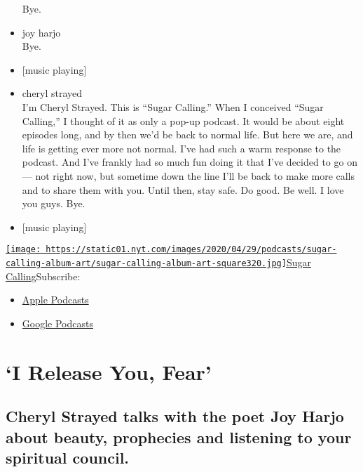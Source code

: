 \begin{itemize}
  Bye.
\item
  joy harjo\\
  Bye.
\item
  {[}music playing{]}
\item
  cheryl strayed\\
  I'm Cheryl Strayed. This is ``Sugar Calling.'' When I conceived
  ``Sugar Calling,'' I thought of it as only a pop-up podcast. It would
  be about eight episodes long, and by then we'd be back to normal life.
  But here we are, and life is getting ever more not normal. I've had
  such a warm response to the podcast. And I've frankly had so much fun
  doing it that I've decided to go on --- not right now, but sometime
  down the line I'll be back to make more calls and to share them with
  you. Until then, stay safe. Do good. Be well. I love you guys. Bye.
\item
  {[}music playing{]}
\end{itemize}

\href{https://www.nytimes.com/column/sugar-calling}{\texttt{[image: https://static01.nyt.com/images/2020/04/29/podcasts/sugar-calling-album-art/sugar-calling-album-art-square320.jpg]}Sugar
Calling}Subscribe:

\begin{itemize}
\tightlist
\item
  \href{https://itunes.apple.com/us/podcast/id1505881384}{Apple
  Podcasts}
\item
  \href{https://podcasts.google.com/?feed=aHR0cHM6Ly9yc3MuYXJ0MTkuY29tL3N1Z2FyLWNhbGxpbmc\&ved=0CAUQrrcFahcKEwjA8Kyn09voAhUAAAAAHQAAAAAQBQ}{Google
  Podcasts}
\end{itemize}

\hypertarget{i-release-you-fear-1}{%
\section{`I Release You, Fear'}\label{i-release-you-fear-1}}

\hypertarget{cheryl-strayed-talks-with-the-poet-joy-harjo-about-beauty-prophecies-and-listening-to-your-spiritual-council-1}{%
\subsection{Cheryl Strayed talks with the poet Joy Harjo about beauty,
prophecies and listening to your spiritual
council.}\label{cheryl-strayed-talks-with-the-poet-joy-harjo-about-beauty-prophecies-and-listening-to-your-spiritual-council-1}}

